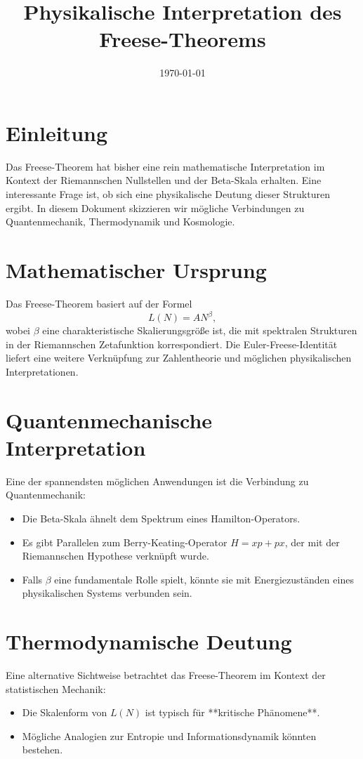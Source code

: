 \documentclass{article} %
\title{Physikalische Interpretation des Freese-Theorems}
\author{}
\date{\today}
\begin{document}
\maketitle

\section{Einleitung}
Das Freese-Theorem hat bisher eine rein mathematische Interpretation im Kontext der Riemannschen Nullstellen und der Beta-Skala erhalten. Eine interessante Frage ist, ob sich eine physikalische Deutung dieser Strukturen ergibt. In diesem Dokument skizzieren wir mögliche Verbindungen zu Quantenmechanik, Thermodynamik und Kosmologie.

\section{Mathematischer Ursprung}
Das Freese-Theorem basiert auf der Formel
\begin{equation}
    L(N) = A N^{\beta},
\end{equation}
wobei $\beta$ eine charakteristische Skalierungsgröße ist, die mit spektralen Strukturen in der Riemannschen Zetafunktion korrespondiert. Die Euler-Freese-Identität liefert eine weitere Verknüpfung zur Zahlentheorie und möglichen physikalischen Interpretationen.

\section{Quantenmechanische Interpretation}
Eine der spannendsten möglichen Anwendungen ist die Verbindung zu Quantenmechanik:
\begin{itemize}
    \item Die Beta-Skala ähnelt dem Spektrum eines Hamilton-Operators.
    \item Es gibt Parallelen zum Berry-Keating-Operator $H = x p + p x$, der mit der Riemannschen Hypothese verknüpft wurde.
    \item Falls $\beta$ eine fundamentale Rolle spielt, könnte sie mit Energiezuständen eines physikalischen Systems verbunden sein.
\end{itemize}

\section{Thermodynamische Deutung}
Eine alternative Sichtweise betrachtet das Freese-Theorem im Kontext der statistischen Mechanik:
\begin{itemize}
    \item Die Skalenform von $L(N)$ ist typisch für **kritische Phänomene**.
    \item Mögliche Analogien zur Entropie und Informationsdynamik könnten bestehen.
\end{itemize}
\end{document}
